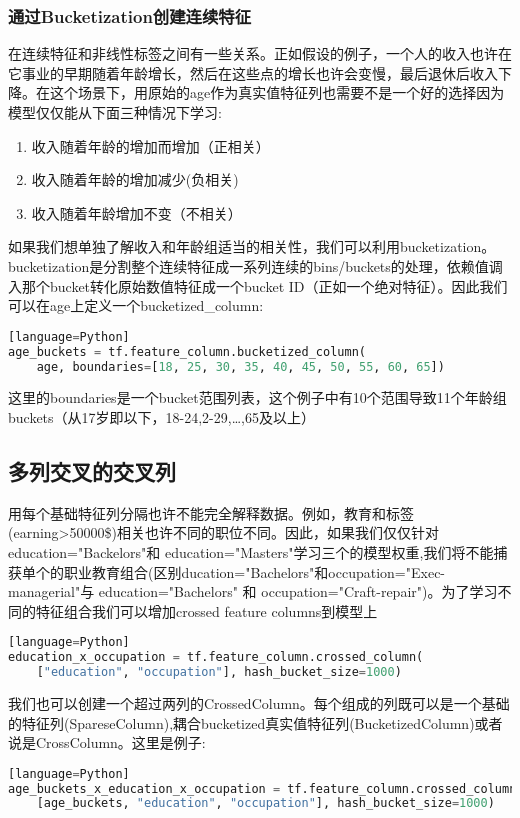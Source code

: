 \subsubsection{通过Bucketization创建连续特征}
在连续特征和非线性标签之间有一些关系。正如假设的例子，一个人的收入也许在它事业的早期随着年龄增长，然后在这些点的增长也许会变慢，最后退休后收入下降。在这个场景下，用原始的age作为真实值特征列也需要不是一个好的选择因为模型仅仅能从下面三种情况下学习:
\begin{enumerate}
\item 收入随着年龄的增加而增加（正相关）
\item 收入随着年龄的增加减少(负相关)
\item 收入随着年龄增加不变（不相关）
\end{enumerate}
如果我们想单独了解收入和年龄组适当的相关性，我们可以利用bucketization。bucketization是分割整个连续特征成一系列连续的bins/buckets的处理，依赖值调入那个bucket转化原始数值特征成一个bucket ID（正如一个绝对特征）。因此我们可以在age上定义一个bucketized\_column:
\begin{lstlisting}[language=Python][language=Python]
age_buckets = tf.feature_column.bucketized_column(
    age, boundaries=[18, 25, 30, 35, 40, 45, 50, 55, 60, 65])
\end{lstlisting}
这里的boundaries是一个bucket范围列表，这个例子中有10个范围导致11个年龄组buckets（从17岁即以下，18-24,2-29,\ldots,65及以上）
\subsection{多列交叉的交叉列}
用每个基础特征列分隔也许不能完全解释数据。例如，教育和标签(earning>50000\$)相关也许不同的职位不同。因此，如果我们仅仅针对education="Backelors"和 education="Masters"学习三个的模型权重,我们将不能捕获单个的职业教育组合(区别ducation="Bachelors"和occupation="Exec-managerial"与 education="Bachelors" 和 occupation="Craft-repair")。为了学习不同的特征组合我们可以增加crossed feature columns到模型上
\begin{lstlisting}[language=Python][language=Python]
education_x_occupation = tf.feature_column.crossed_column(
    ["education", "occupation"], hash_bucket_size=1000)
\end{lstlisting}
我们也可以创建一个超过两列的CrossedColumn。每个组成的列既可以是一个基础的特征列(SpareseColumn),耦合bucketized真实值特征列(BucketizedColumn)或者说是CrossColumn。这里是例子:
\begin{lstlisting}[language=Python][language=Python]
age_buckets_x_education_x_occupation = tf.feature_column.crossed_column(
    [age_buckets, "education", "occupation"], hash_bucket_size=1000)
\end{lstlisting}

